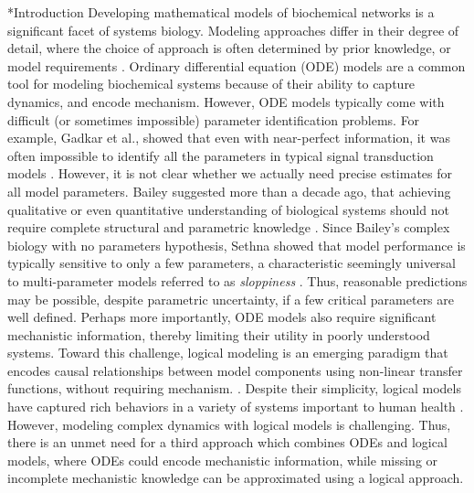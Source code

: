 \documentclass[12pt]{article}
\makeatletter
\renewcommand\section{\@startsection
	{subsection}{2}{0mm}
	{-0.2in}
	{0.05\baselineskip}
	{\normalfont\large\bfseries}}
\makeatother
\begin{document}
\section*{Introduction}
Developing mathematical models of biochemical networks is a significant facet of systems biology.
Modeling approaches differ in their degree of detail, where the choice of approach is often determined by prior knowledge, or model requirements \citep{2012_kholodenko_kolch_SciSig}. 
Ordinary differential equation (ODE) models are a common tool for modeling biochemical systems because of their ability to capture dynamics, and encode mechanism.
However, ODE models typically come with difficult (or sometimes impossible) parameter identification problems. 
For example, Gadkar et al., showed that even with near-perfect information, 
it was often impossible to identify all the parameters in typical signal transduction models \citep{Gadkar:2005ad}. 
However, it is not clear whether we actually need precise estimates for all model parameters. 
Bailey suggested more than a decade ago, that achieving qualitative or even quantitative understanding of biological systems 
should not require complete structural and parametric knowledge \citep{2001_bailey_NatBiotech}. 
Since Bailey's complex biology with no parameters hypothesis, Sethna showed that model performance is typically 
sensitive to only a few parameters, a characteristic seemingly universal to multi-parameter models referred to as \textit{sloppiness} \citep{Machta:2013aa}.
Thus, reasonable predictions may be possible, despite parametric uncertainty, if a few critical parameters are well defined. 
Perhaps more importantly, ODE models also require significant mechanistic information, thereby limiting their utility in poorly understood systems.
Toward this challenge, logical modeling is an emerging paradigm that encodes causal relationships between model components using non-linear transfer functions, 
without requiring mechanism. \citep{Morris:2010aa}. 
Despite their simplicity, logical models have captured rich behaviors in a variety of systems important to human health \citep{Saez-Rodriguez:2011aa,Morris:2011ys,Morris:2012aa}. 
However, modeling complex dynamics with logical models is challenging. 
Thus, there is an unmet need for a third approach which combines ODEs and logical models, where ODEs could encode mechanistic information, 
while missing or incomplete mechanistic knowledge can be approximated using a logical approach.  
\end{document}
